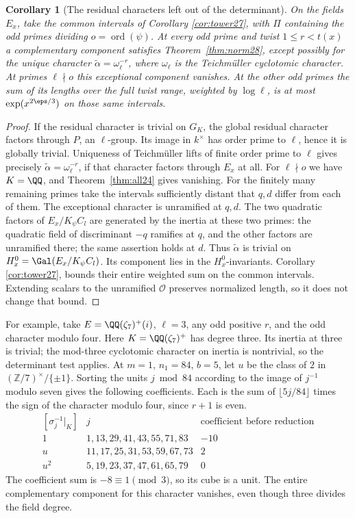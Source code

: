 \documentclass[a4paper,11pt]{article}
\newtheorem{corollary}[proposition]{Corollary}
\theoremstyle{definition}
\theoremstyle{remark}
\newcommand{\ZZ}{\mathbb Z}\newcommand{\ord}{\operatorname{ord}}
\numberwithin{equation}{section}
\newcommand{\OO}{\mathcal O}
\begin{document}
\begin{corollary}[The residual characters left out of the determinant]\label{cor:res28}
On the fields \(E_x\), take the common intervals of Corollary \ref{cor:tower27}, with \(\Pi\) containing the odd primes dividing \(o=\operatorname{ord}(\psi)\). At every odd prime and twist \(1\le r<t(x)\) a complementary component satisfies Theorem~\ref{thm:norm28}, except possibly for the unique character \(\widetilde\alpha=\omega_\ell^{-r}\), where \(\omega_\ell\) is the Teichm\"uller cyclotomic character. At primes \(\ell\nmid o\) this exceptional component vanishes. At the other odd primes the sum of its lengths over the full twist range, weighted by \(\log\ell\), is at most \(\exp(x^{2\eps/3})\) on those same intervals.
\end{corollary}
\begin{proof}
If the residual character is trivial on \(G_K\), the global residual character factors through \(P\), an \(\ell\)-group. Its image in \(k^\times\) has order prime to \(\ell\), hence it is globally trivial. Uniqueness of Teichm\"uller lifts of finite order prime to \(\ell\) gives precisely \(\widetilde\alpha=\omega_\ell^{-r}\), if that character factors through \(E_x\) at all. For \(\ell\nmid o\) we have \(K=\QQ\), and Theorem~\ref{thm:all24} gives vanishing. For the finitely many remaining primes take the intervals sufficiently distant that \(q,d\) differ from each of them. The exceptional character is unramified at \(q,d\). The two quadratic factors of \(E_x/K_\psi C_l\) are generated by the inertia at these two primes: the quadratic field of discriminant \(-q\) ramifies at \(q\), and the other factors are unramified there; the same assertion holds at \(d\). Thus \(\widetilde\alpha\) is trivial on \(H_x^0=\Gal(E_x/K_\psi C_l)\). Its component lies in the \(H_x^0\)-invariants. Corollary \ref{cor:tower27}, bounds their entire weighted sum on the common intervals. Extending scalars to the unramified \(\OO\) preserves normalized length, so it does not change that bound.
\end{proof}

For example, take \(E=\QQ(\zeta_7)^+(i)\), \(\ell=3\), any odd positive \(r\), and the odd character modulo four. Here \(K=\QQ(\zeta_7)^+\) has degree three. Its inertia at three is trivial; the mod-three cyclotomic character on inertia is nontrivial, so the determinant test applies. At \(m=1\), \(n_1=84\), \(b=5\), let \(u\) be the class of \(2\) in \((\ZZ/7)^\times/\{\pm1\}\). Sorting the units \(j\bmod84\) according to the image of \(j^{-1}\) modulo seven gives the following coefficients. Each is the sum of \(\lfloor5j/84\rfloor\) times the sign of the character modulo four, since \(r+1\) is even.
\[
\begin{array}{c|l|r}
 [\sigma_j^{-1}|_K]&j&\text{coefficient before reduction}\\ \hline
 1&1,13,29,41,43,55,71,83&-10\\
 u&11,17,25,31,53,59,67,73&2\\
 u^2&5,19,23,37,47,61,65,79&0
\end{array}
\]
The coefficient sum is \(-8\equiv1\pmod3\), so its cube is a unit. The entire complementary component for this character vanishes, even though three divides the field degree.
\end{document}
